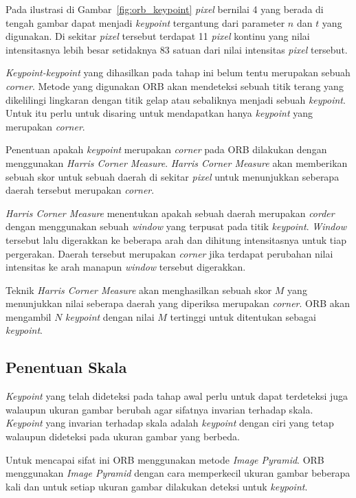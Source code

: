 Pada ilustrasi di Gambar~\ref{fig:orb_keypoint} \textit{pixel} bernilai 4 yang berada di tengah gambar dapat menjadi \textit{keypoint} tergantung dari parameter $n$ dan $t$ yang digunakan. Di sekitar \textit{pixel} tersebut terdapat 11 \textit{pixel} kontinu yang nilai intensitasnya lebih besar setidaknya 83 satuan dari nilai intensitas \textit{pixel} tersebut.

\textit{Keypoint-keypoint} yang dihasilkan pada tahap ini belum tentu merupakan sebuah \textit{corner}. Metode yang digunakan ORB akan mendeteksi sebuah titik terang yang dikelilingi lingkaran dengan titik gelap atau sebaliknya menjadi sebuah \textit{keypoint}. Untuk itu perlu untuk disaring untuk mendapatkan hanya \textit{keypoint} yang merupakan \textit{corner}. 

Penentuan apakah \textit{keypoint} merupakan \textit{corner} pada ORB dilakukan dengan menggunakan \textit{Harris Corner Measure}. \textit{Harris Corner Measure} akan memberikan sebuah skor untuk sebuah daerah di sekitar \textit{pixel} untuk menunjukkan seberapa daerah tersebut merupakan \textit{corner}. 

\textit{Harris Corner Measure} menentukan apakah sebuah daerah merupakan \textit{corder} dengan menggunakan sebuah \textit{window} yang terpusat pada titik \textit{keypoint}. \textit{Window} tersebut lalu digerakkan ke beberapa arah dan dihitung intensitasnya untuk tiap pergerakan. Daerah tersebut merupakan \textit{corner} jika terdapat perubahan nilai intensitas ke arah manapun \textit{window} tersebut digerakkan.

Teknik \textit{Harris Corner Measure} akan menghasilkan sebuah skor $M$ yang menunjukkan nilai seberapa daerah yang diperiksa merupakan \textit{corner}. ORB akan mengambil $N$ \textit{keypoint} dengan nilai $M$ tertinggi untuk ditentukan sebagai \textit{keypoint}.  

\subsection{Penentuan Skala}
\label{subsec:orb_skala}
\textit{Keypoint} yang telah dideteksi pada tahap awal perlu untuk dapat terdeteksi juga walaupun ukuran gambar berubah agar sifatnya invarian terhadap skala. \textit{Keypoint} yang invarian terhadap skala adalah \textit{keypoint} dengan ciri yang tetap walaupun dideteksi pada ukuran gambar yang berbeda. 

Untuk mencapai sifat ini ORB menggunakan metode \textit{Image Pyramid}. ORB menggunakan \textit{Image Pyramid} dengan cara memperkecil ukuran gambar beberapa kali dan untuk setiap ukuran gambar dilakukan deteksi untuk \textit{keypoint}. 

